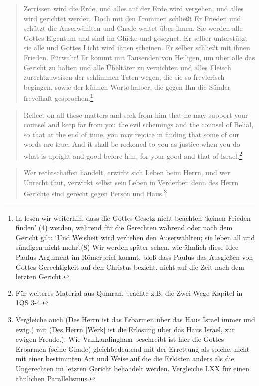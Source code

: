 \begin{quote}
	Zerrissen wird die Erde,
und alles auf der Erde wird vergehen,
und alles wird gerichtet werden.
Doch mit den Frommen schließt Er Frieden
und schützt die Auserwählten
und Gnade waltet über ihnen.
Sie werden alle Gottes Eigentum
und sind im Glücke und gesegnet.
Er selber unterstützt sie alle
und Gottes Licht wird ihnen scheinen.
Er selber schließt mit ihnen Frieden.
Fürwahr! Er kommt mit Tausenden von Heiligen,
um über alle das Gericht zu halten
und alle Übeltäter zu vernichten
und alles Fleisch zurechtzuweisen
der schlimmen Taten wegen,
die sie so frevlerisch begingen,
sowie der kühnen Worte halber,
die gegen Ihn die Sünder frevelhaft gesprochen.\footnote{
	In \Cite[5]{aeth-hen} lesen wir weiterhin, dass die Gottes Gesetz nicht beachten `keinen Frieden finden' (4) werden, während für die Gerechten
	während oder nach dem Gericht gilt: `Und Weisheit wird verliehen den Auserwählten; sie leben all und sündigen nicht mehr'.(8)
	Wir werden später sehen, wie ähnlich diese Idee Paulus Argument im Römerbrief kommt, bloß dass Paulus das Ausgießen von Gottes Gerechtigkeit auf den Christus
	bezieht, nicht auf die Zeit nach dem letzten Gericht.
}
\end{quote}

\begin{quote}
Reflect on all these matters and seek from him that he may support your
counsel and keep far from you the evil schemings and the counsel of Belial,
so that at the end of time, you may rejoice in finding that some of our words
are true. And it shall be reckoned to you as justice when you do what is
upright and good before him, for your good and that of Israel.\footnote{
	Für weiteres Material aus Qumran, beachte z.B. die Zwei-Wege Kapitel in 1QS 3-4.
}
\end{quote}

\begin{quote}
	Wer rechtschaffen handelt, erwirbt sich Leben beim Herrn,
  und wer Unrecht thut, verwirkt selbst sein Leben in Verderben
	denn des Herrn Gerichte sind gerecht gegen Person und Haus.\footnote{
		Vergleiche auch \Cite[9:11]{pss-sol} (Des Herrn ist das Erbarmen über das Haus Israel immer und ewig.) mit \Cite[10:8]{pss-sol} (Des Herrn [Werk] ist die Erlösung über das Haus Israel, zur ewigen Freude.).
		Wie VanLandingham beschreibt ist hier die Gottes Erbarmen (seine Gnade) gleichbedeutend mit der Errettung als solche, nicht mit einer bestimmten Art und Weise auf die 
		die Erlösten anders als die Ungerechten im letzten Gericht behandelt werden. Vergleiche  LXX für einen ähnlichen Parallelismus.
	}
\end{quote}

